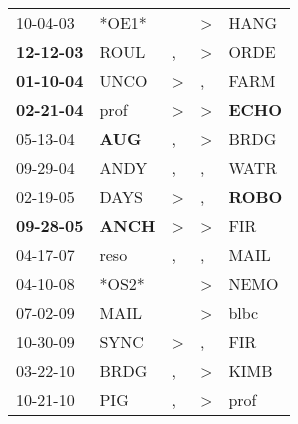 \begin{supertabular}{p{0.07\textwidth}p{0.06\textwidth}p{0.02\textwidth}p{0.02\textwidth}p{0.06\textwidth}}
          10-04-03\textsuperscript{} &                            *OE1* &                  &     \textgreater &           HANG\textsuperscript{} \\
 \textbf{12-12-03\textsuperscript{}} &           ROUL\textsuperscript{} &                , &     \textgreater &           ORDE\textsuperscript{} \\
 \textbf{01-10-04\textsuperscript{}} &           UNCO\textsuperscript{} &     \textgreater &                , &           FARM\textsuperscript{} \\
 \textbf{02-21-04\textsuperscript{}} &           prof\textsuperscript{} &     \textgreater &     \textgreater &  \textbf{ECHO\textsuperscript{}} \\
          05-13-04\textsuperscript{} &   \textbf{AUG\textsuperscript{}} &                , &     \textgreater &           BRDG\textsuperscript{} \\
          09-29-04\textsuperscript{} &           ANDY\textsuperscript{} &                , &                , &           WATR\textsuperscript{} \\
          02-19-05\textsuperscript{} &           DAYS\textsuperscript{} &     \textgreater &                , &  \textbf{ROBO\textsuperscript{}} \\
 \textbf{09-28-05\textsuperscript{}} &  \textbf{ANCH\textsuperscript{}} &     \textgreater &     \textgreater &            FIR\textsuperscript{} \\
          04-17-07\textsuperscript{} &           reso\textsuperscript{} &                , &                , &           MAIL\textsuperscript{} \\
          04-10-08\textsuperscript{} &                            *OS2* &                  &     \textgreater &           NEMO\textsuperscript{} \\
          07-02-09\textsuperscript{} &           MAIL\textsuperscript{} &                  &     \textgreater &           blbc\textsuperscript{} \\
          10-30-09\textsuperscript{} &           SYNC\textsuperscript{} &     \textgreater &                , &            FIR\textsuperscript{} \\
          03-22-10\textsuperscript{} &           BRDG\textsuperscript{} &                , &     \textgreater &           KIMB\textsuperscript{} \\
          10-21-10\textsuperscript{} &            PIG\textsuperscript{} &                , &     \textgreater &           prof\textsuperscript{} \\

\end{supertabular}
